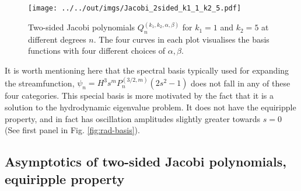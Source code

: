 \begin{figure}[htbp]
    \centering
    \texttt{[image: ../../out/imgs/Jacobi\_2sided\_k1\_1\_k2\_5.pdf]}
    \caption{Two-sided Jacobi polynomials $Q_n^{(k_1, k_2, \alpha, \beta)}$ for $k_1 = 1$ and $k_2 = 5$ at different degrees $n$. The four curves in each plot visualises the basis functions with four different choices of $\alpha, \beta$.}
    \label{fig:Jacobi-2-sided}
\end{figure}

It is worth mentioning here that the spectral basis typically used for expanding the streamfunction, $\psi_n = H^3 s^m P_n^{(3/2, m)}(2s^2 - 1)$ does not fall in any of these four categories. This special basis is more motivated by the fact that it is a solution to the hydrodynamic eigenvalue problem. It does not have the equiripple property, and in fact has oscillation amplitudes slightly greater towards $s=0$ (See first panel in Fig. \ref{fig:rad-basis}).



\subsection{Asymptotics of two-sided Jacobi polynomials, equiripple property}

